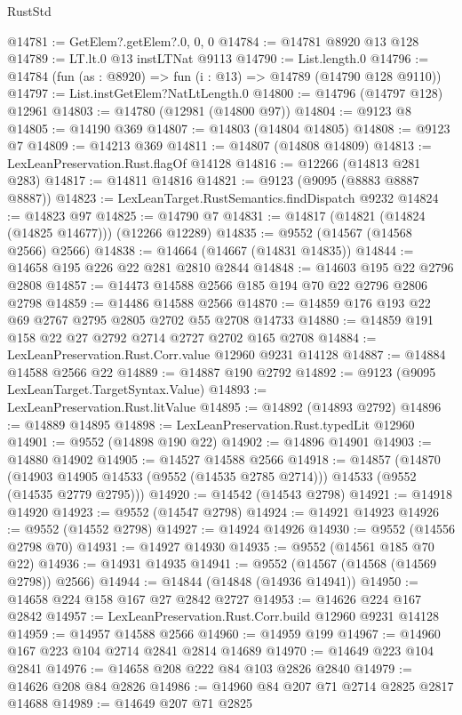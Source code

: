 \begin{lexlean}{RustStd}
\begin{coremodule}
@14781 := GetElem?.getElem?.{0, 0, 0}
@14784 := @14781 @8920 @13 @128
@14789 := LT.lt.{0} @13 instLTNat @9113
@14790 := List.length.{0}
@14796 := @14784 (fun (as : @8920) => fun (i : @13) => @14789 (@14790 @128 @9110))
@14797 := List.instGetElem?NatLtLength.{0}
@14800 := @14796 (@14797 @128) @12961
@14803 := @14780 (@12981 (@14800 @97))
@14804 := @9123 @8
@14805 := @14190 @369
@14807 := @14803 (@14804 @14805)
@14808 := @9123 @7
@14809 := @14213 @369
@14811 := @14807 (@14808 @14809)
@14813 := LexLeanPreservation.Rust.flagOf @14128
@14816 := @12266 (@14813 @281 @283)
@14817 := @14811 @14816
@14821 := @9123 (@9095 (@8883 @8887 @8887))
@14823 := LexLeanTarget.RustSemantics.findDispatch @9232
@14824 := @14823 @97
@14825 := @14790 @7
@14831 := @14817 (@14821 (@14824 (@14825 @14677))) (@12266 @12289)
@14835 := @9552 (@14567 (@14568 @2566) @2566)
@14838 := @14664 (@14667 (@14831 @14835))
@14844 := @14658 @195 @226 @22 @281 @2810 @2844
@14848 := @14603 @195 @22 @2796 @2808
@14857 := @14473 @14588 @2566 @185 @194 @70 @22 @2796 @2806 @2798
@14859 := @14486 @14588 @2566
@14870 := @14859 @176 @193 @22 @69 @2767 @2795 @2805 @2702 @55 @2708 @14733
@14880 := @14859 @191 @158 @22 @27 @2792 @2714 @2727 @2702 @165 @2708
@14884 := LexLeanPreservation.Rust.Corr.value @12960 @9231 @14128
@14887 := @14884 @14588 @2566 @22
@14889 := @14887 @190 @2792
@14892 := @9123 (@9095 LexLeanTarget.TargetSyntax.Value)
@14893 := LexLeanPreservation.Rust.litValue
@14895 := @14892 (@14893 @2792)
@14896 := @14889 @14895
@14898 := LexLeanPreservation.Rust.typedLit @12960
@14901 := @9552 (@14898 @190 @22)
@14902 := @14896 @14901
@14903 := @14880 @14902
@14905 := @14527 @14588 @2566
@14918 := @14857
    (@14870 (@14903 @14905 @14533 (@9552 (@14535 @2785 @2714))) @14533 (@9552 (@14535 @2779 @2795)))
@14920 := @14542 (@14543 @2798)
@14921 := @14918 @14920
@14923 := @9552 (@14547 @2798)
@14924 := @14921 @14923
@14926 := @9552 (@14552 @2798)
@14927 := @14924 @14926
@14930 := @9552 (@14556 @2798 @70)
@14931 := @14927 @14930
@14935 := @9552 (@14561 @185 @70 @22)
@14936 := @14931 @14935
@14941 := @9552 (@14567 (@14568 (@14569 @2798)) @2566)
@14944 := @14844 (@14848 (@14936 @14941))
@14950 := @14658 @224 @158 @167 @27 @2842 @2727
@14953 := @14626 @224 @167 @2842
@14957 := LexLeanPreservation.Rust.Corr.build @12960 @9231 @14128
@14959 := @14957 @14588 @2566
@14960 := @14959 @199
@14967 := @14960 @167 @223 @104 @2714 @2841 @2814 @14689
@14970 := @14649 @223 @104 @2841
@14976 := @14658 @208 @222 @84 @103 @2826 @2840
@14979 := @14626 @208 @84 @2826
@14986 := @14960 @84 @207 @71 @2714 @2825 @2817 @14688
@14989 := @14649 @207 @71 @2825

\end{coremodule}
\end{lexlean}
